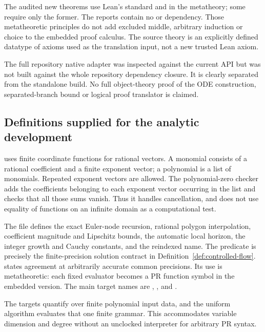 The audited new theorems use Lean's standard  and
 in the metatheory; some require only the former. The
reports contain no  or  dependency.
Those metatheoretic principles do not add excluded middle, arbitrary
induction or choice to the embedded  proof calculus. The
source theory  is an explicitly defined datatype of
axioms used as the translation input, not a new trusted Lean axiom.

The full repository native adapter was inspected against the current API
but was not built against the whole repository dependency closure. It is
clearly separated from the standalone build. No full object-theory proof
of the ODE construction, separated-branch bound or logical proof translator
is claimed.

\subsection{Definitions supplied for the analytic development}

 uses finite coordinate functions
 for rational vectors. A monomial consists of a rational
coefficient and a finite exponent vector; a polynomial is a list of
monomials. Repeated exponent vectors are allowed. The polynomial-zero
checker adds the coefficients belonging to each exponent vector occurring
in the list and checks that all those sums vanish. Thus it handles
cancellation, and does not use equality of functions on an infinite
domain as a computational test.

The file defines the exact Euler-node recursion, rational polygon
interpolation, coefficient magnitude and Lipschitz bounds, the automatic
local horizon, the integer growth and Cauchy constants, and the reindexed
name. The predicate  is precisely the finite-precision
solution contract in Definition~\ref{def:controlled-flow}.
 states agreement at arbitrarily accurate common
precisions. Its use is metatheoretic: each fixed evaluator becomes a PR
function symbol in the embedded version. The main target names are
, , 
and .

The targets quantify over finite polynomial input data, and the uniform
algorithm evaluates that one finite grammar. This accommodates variable
dimension and degree without an unclocked interpreter for arbitrary PR
syntax.


